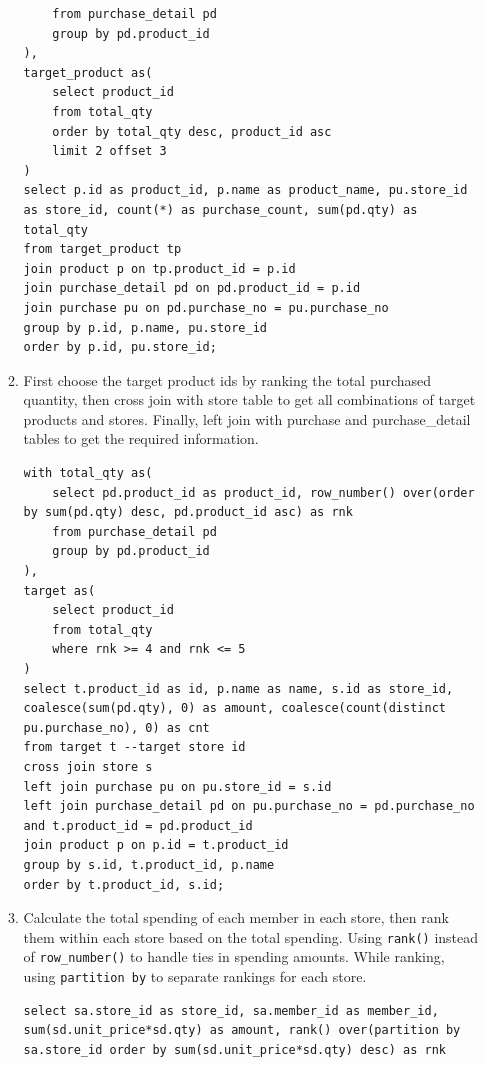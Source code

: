 \documentclass[12pt,a4paper]{article}
\begin{document}
\begin{enumerate}
\begin{enumerate}
\begin{verbatim}
    from purchase_detail pd
    group by pd.product_id
),
target_product as(
    select product_id
    from total_qty
    order by total_qty desc, product_id asc
    limit 2 offset 3
)
select p.id as product_id, p.name as product_name, pu.store_id as store_id, count(*) as purchase_count, sum(pd.qty) as total_qty
from target_product tp
join product p on tp.product_id = p.id
join purchase_detail pd on pd.product_id = p.id
join purchase pu on pd.purchase_no = pu.purchase_no
group by p.id, p.name, pu.store_id
order by p.id, pu.store_id;
        \end{verbatim}
        \item First choose the target product ids by ranking the total purchased quantity, then cross join with store table to get all combinations of target products and stores. Finally, left join with purchase and purchase\_detail tables to get the required information.
        \begin{verbatim}
with total_qty as(
    select pd.product_id as product_id, row_number() over(order by sum(pd.qty) desc, pd.product_id asc) as rnk
    from purchase_detail pd
    group by pd.product_id
),
target as(
    select product_id
    from total_qty 
    where rnk >= 4 and rnk <= 5
)
select t.product_id as id, p.name as name, s.id as store_id, coalesce(sum(pd.qty), 0) as amount, coalesce(count(distinct pu.purchase_no), 0) as cnt
from target t --target store id
cross join store s
left join purchase pu on pu.store_id = s.id
left join purchase_detail pd on pu.purchase_no = pd.purchase_no and t.product_id = pd.product_id
join product p on p.id = t.product_id 
group by s.id, t.product_id, p.name
order by t.product_id, s.id;          
        \end{verbatim}
        \item Calculate the total spending of each member in each store, then rank them within each store based on the total spending. Using \texttt{rank()} instead of \texttt{row\_number()} to handle ties in spending amounts. While ranking, using \texttt{partition by} to separate rankings for each store. 
        \begin{verbatim}
select sa.store_id as store_id, sa.member_id as member_id, sum(sd.unit_price*sd.qty) as amount, rank() over(partition by sa.store_id order by sum(sd.unit_price*sd.qty) desc) as rnk


\end{verbatim}
\end{enumerate}
\end{enumerate}
\end{document}
